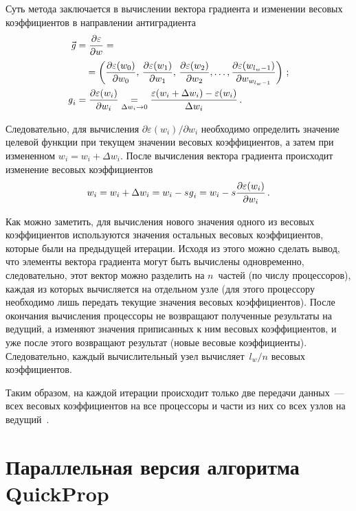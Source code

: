 \begin{multicols}{2}
 Суть метода заключается в вычислении вектора градиента и изменении весовых
коэффициентов в направлении антиградиента~\cite{9kr, 10kr}
\begin{align*}
\vec{\mbox{\textit{g}}} &= \displaystyle\frac{\displaystyle \partial \varepsilon\mathstrut}{\displaystyle \partial w\mathstrut} ={}\\
&\ \ \ {}=\left ( \displaystyle\frac{\displaystyle \partial \varepsilon (w_0)\mathstrut}{\displaystyle \partial
w_0\mathstrut},\,\displaystyle\frac{\displaystyle \partial \varepsilon (w_1)\mathstrut}{\displaystyle \partial w_1\mathstrut},\,\displaystyle\frac{\displaystyle \partial \varepsilon (w_2)\mathstrut}{\displaystyle \partial
w_2\mathstrut},\ldots , \displaystyle\frac{\displaystyle \partial \varepsilon (w_{l_w-1})\mathstrut}{\displaystyle \partial w_{w_{l_w-1}}\mathstrut}\right
)\,;\\
\mbox{\textit{g}}_i & = \displaystyle\frac{\displaystyle \partial \varepsilon (w_i)\mathstrut}{\displaystyle  \partial w_i\mathstrut} \underset{\Delta w_i\rightarrow 0}{=}
\displaystyle\frac{\displaystyle \varepsilon (w_i+\Delta w_i)-\varepsilon(w_i)\mathstrut}{\displaystyle \Delta w_i\mathstrut}\,.
\end{align*}

Следовательно, для вычисления $\partial \varepsilon (w_i)/\partial w_i$ необходимо определить
значение целевой функции при текущем значении весовых коэффициентов, а затем при
измененном $w_i=w_i+\Delta w_i$. После вычисления вектора градиента происходит
изменение весовых коэффициентов
\begin{equation*}
w_i = w_i+\Delta w_i = w_i-s\mbox{\textit{g}}_i=w_i-s\displaystyle\frac{\displaystyle \partial \varepsilon(w_i)\mathstrut}{\displaystyle \partial w_i\mathstrut}\,.
\end{equation*}

 Как можно заметить, для вычисления нового значения одного из весовых
коэффициентов используются значения остальных весовых коэффициентов, которые были
на предыдущей итерации. Исходя из этого можно сделать вывод, что элементы вектора
градиента могут быть вычислены одновременно, следовательно, этот вектор можно
разделить на $n$~частей (по числу процессоров), каж\-дая из которых вычисляется на
отдельном узле (для этого процессору необходимо лишь передать текущие значения весовых
коэффициентов). После окончания вычисления процессоры не возвращают полученные
результаты на ведущий, а изменяют значения приписанных к ним весовых коэффициентов, и
уже после этого возвращают результат (новые весовые коэффициенты). Следовательно,
каж\-дый вычислительный узел вычисляет~$l_w/n$ весовых коэффициентов.

 Таким образом, на каждой итерации происходит только две передачи данных~--- всех
весовых коэффициентов на все процессоры и части из них со всех узлов на
ведущий~\cite{3kr}.

\section{Параллельная версия алгоритма QuickProp}


\end{multicols}

